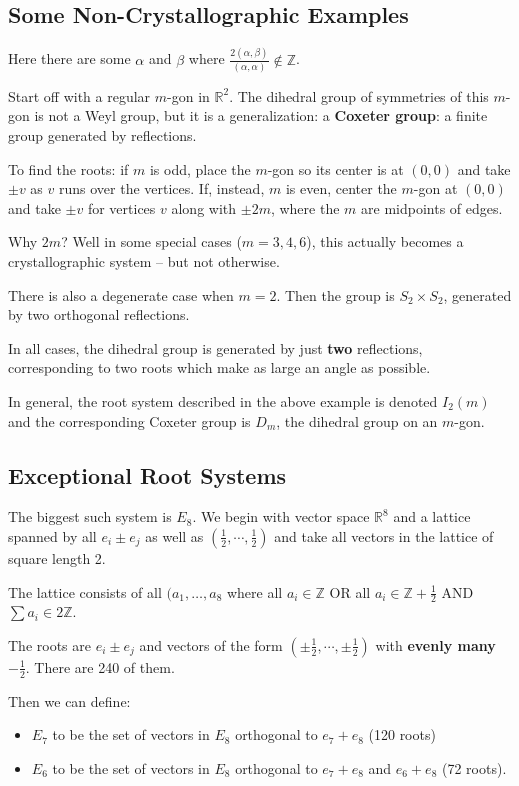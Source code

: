 \documentclass[12pt]{article}
\theoremstyle{nonumberbreak}
\theoremstyle{changebreak}
\theoremstyle{nonumberbreak}
\theoremstyle{change}
\newcommand*{\Z}{
\mathbb{Z}
}
\newcommand*{\R}{
\mathbb{R}
}
\begin{document}
\subsection{Some Non-Crystallographic Examples}
Here there are some $\alpha$ and $\beta$ where $\frac{2(\alpha,\beta)}{(\alpha,\alpha)}\notin\Z$.
\begin{ex}[$I_2(m)$]
	Start off with a regular $m$-gon in $\R^2$. The dihedral group of symmetries of this $m$-gon is not a Weyl group, 
	but it is a generalization: a \textbf{Coxeter group}: a finite group generated by reflections.

	To find the roots: if $m$ is odd, place the $m$-gon so its center is at $(0,0)$ and take $\pm v$ as $v$ runs over the vertices. If, instead,
	$m$ is even, center the $m$-gon at $(0,0)$ and take $\pm v$ for vertices $v$ along with $\pm 2m$, where the $m$ are 
	midpoints of edges.

	Why $2m$? Well in some special cases ($m=3,4,6$), this actually becomes a crystallographic system -- but not otherwise.

	There is also a degenerate case when $m=2$. Then the group is $S_2\times S_2$, generated by two orthogonal reflections.

	In all cases, the dihedral group is generated by just \textbf{two} reflections, corresponding to two roots which make as large an angle as possible.
\end{ex}

In general, the root system described in the above example is denoted $I_2(m)$ and the corresponding Coxeter group is
$D_m$, the dihedral group on an $m$-gon.

\subsection{Exceptional Root Systems}
\begin{ex}[$E_8$]
	The biggest such system is $E_8$. We begin with vector space $\R^8$ and a lattice spanned by all $e_i\pm e_j$
	as well as $(\frac{1}{2},\cdots,\frac{1}{2})$ and take all vectors in the lattice of square length 2.

	The lattice consists of all $(a_1,\dots,a_8$ where all $a_i\in\Z$ OR all $a_i\in \Z+\frac{1}{2}$ AND $\sum a_i\in 2\Z$.

	The roots are $e_i\pm e_j$ and vectors of the form $(\pm\frac{1}{2},\cdots,\pm\frac{1}{2})$ with \textbf{evenly many} $-\frac{1}{2}$. 
	There are 240 of them.
\end{ex}
Then we can define:
\begin{itemize}
	\item $E_7$ to be the set of vectors in $E_8$ orthogonal to $e_7+e_8$ (120 roots)
	\item $E_6$ to be the set of vectors in $E_8$ orthogonal to $e_7+e_8$ and $e_6+e_8$ (72 roots).
\end{itemize}
\end{document}
